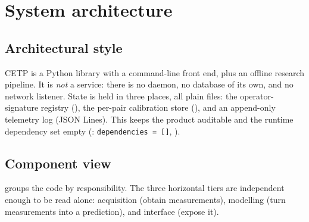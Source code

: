\chapter{System architecture}\label{ch:arch}

\section{Architectural style}
CETP is a Python library with a command-line front end, plus an offline research pipeline. It is
\emph{not} a service: there is no daemon, no database of its own, and no network listener. State is
held in three places, all plain files: the operator-signature registry
(), the per-pair calibration store (), and
an append-only telemetry log (JSON Lines). This keeps the product auditable and the runtime
dependency set empty (: \texttt{dependencies = []}, \evFILE).

\section{Component view}
 groups the code by responsibility. The three horizontal tiers are independent
enough to be read alone: acquisition (obtain measurements), modelling (turn measurements into a
prediction), and interface (expose it).

